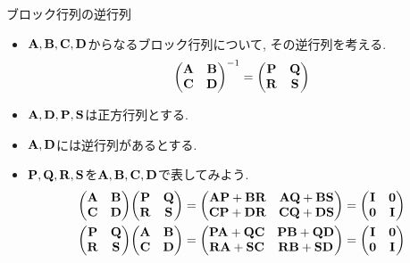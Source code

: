 \documentclass[dvipdfmx,notheorems,t]{beamer}
\begin{document}
\begin{frame}{ブロック行列の逆行列}
\begin{itemize}
  \item $\vb{A}, \vb{B}, \vb{C}, \vb{D}$からなるブロック行列について, その逆行列を考える.
  \begin{align*}
    \mqty(\vb{A} & \vb{B} \\ \vb{C} & \vb{D})^{-1}
      = \mqty(\vb{P} & \vb{Q} \\ \vb{R} & \vb{S})
  \end{align*}
  \item $\vb{A}, \vb{D}, \vb{P}, \vb{S}$は正方行列とする.
  \item $\vb{A}, \vb{D}$には逆行列があるとする.
  \item $\vb{P}, \vb{Q}, \vb{R}, \vb{S}$を$\vb{A}, \vb{B}, \vb{C}, \vb{D}$で表してみよう.
  \begin{align*}
    \mqty(\vb{A} & \vb{B} \\ \vb{C} & \vb{D}) \mqty(\vb{P} & \vb{Q} \\ \vb{R} & \vb{S})
      &= \mqty(\vb{A} \vb{P} + \vb{B} \vb{R} & \vb{A} \vb{Q} + \vb{B} \vb{S} \\
        \vb{C} \vb{P} + \vb{D} \vb{R} & \vb{C} \vb{Q} + \vb{D} \vb{S})
      = \mqty(\vb{I} & \vb{0} \\ \vb{0} & \vb{I}) \\
    \mqty(\vb{P} & \vb{Q} \\ \vb{R} & \vb{S}) \mqty(\vb{A} & \vb{B} \\ \vb{C} & \vb{D})
      &= \mqty(\vb{P} \vb{A} + \vb{Q} \vb{C} & \vb{P} \vb{B} + \vb{Q} \vb{D} \\
        \vb{R} \vb{A} + \vb{S} \vb{C} & \vb{R} \vb{B} + \vb{S} \vb{D})
      = \mqty(\vb{I} & \vb{0} \\ \vb{0} & \vb{I})
  \end{align*}
\end{itemize}

\end{frame}
\end{document}
